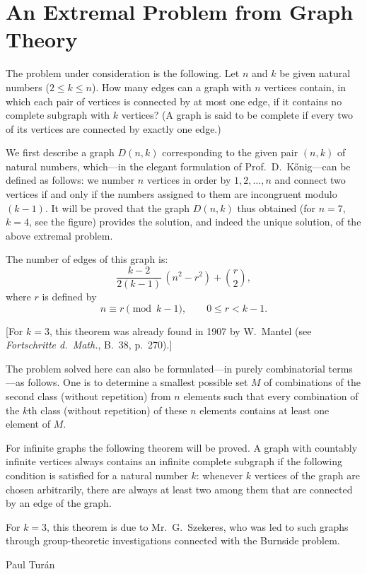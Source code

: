 \documentclass[12pt]{article}
\begin{document}
\section*{An Extremal Problem from Graph Theory}

The problem under consideration is the following. Let $n$ and $k$ be given natural numbers ($2 \le k \le n$). How many edges can a graph with $n$ vertices contain, in which each pair of vertices is connected by at most one edge, if it contains no complete subgraph with $k$ vertices? (A graph is said to be complete if every two of its vertices are connected by exactly one edge.)

We first describe a graph $D(n,k)$ corresponding to the given pair $(n,k)$ of natural numbers, which---in the elegant formulation of Prof.\ D.~Kőnig---can be defined as follows: we number $n$ vertices in order by $1,2,\dots,n$ and connect two vertices if and only if the numbers assigned to them are incongruent modulo $(k-1)$. It will be proved that the graph $D(n,k)$ thus obtained (for $n=7$, $k=4$, see the figure) provides the solution, and indeed the unique solution, of the above extremal problem.

The number of edges of this graph is:
\[
\frac{k-2}{2(k-1)}\,(n^2 - r^2) + \binom{r}{2},
\]
where $r$ is defined by
\[
n \equiv r \pmod{k-1}, \qquad 0 \le r < k-1.
\]

[For $k=3$, this theorem was already found in 1907 by W.~Mantel (see \emph{Fortschritte d.\ Math.}, B.\ 38, p.\ 270).]

The problem solved here can also be formulated---in purely combinatorial terms---as follows. One is to determine a smallest possible set $M$ of combinations of the second class (without repetition) from $n$ elements such that every combination of the $k$th class (without repetition) of these $n$ elements contains at least one element of $M$.

For infinite graphs the following theorem will be proved. A graph with countably infinite vertices always contains an infinite complete subgraph if the following condition is satisfied for a natural number $k$: whenever $k$ vertices of the graph are chosen arbitrarily, there are always at least two among them that are connected by an edge of the graph.

For $k=3$, this theorem is due to Mr.\ G.~Szekeres, who was led to such graphs through group-theoretic investigations connected with the Burnside problem.

\bigskip
\begin{flushright}
Paul Turán
\end{flushright}
\end{document}
